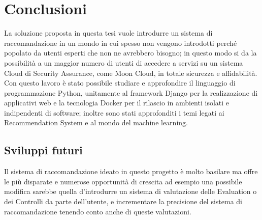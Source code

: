 \chapter{Conclusioni}\label{chp:05-conclusion}
La soluzione proposta in questa tesi vuole introdurre un sistema di raccomandazione in un mondo in cui spesso non vengono 
introdotti perché popolato da utenti esperti che non ne avrebbero bisogno; in questo modo si da la possibilità a un 
maggior numero di utenti di accedere a servizi su un sistema Cloud di Security Assurance, come 
Moon Cloud, in totale sicurezza e affidabilità.\hfill\break
Con questo lavoro è stato possibile studiare e approfondire il linguaggio di programmazione Python, unitamente al framework 
Django per la realizzazione di applicativi web e la tecnologia Docker per il rilascio in ambienti isolati e indipendenti 
di software; inoltre sono stati approfonditi i temi legati ai Recommendation System e al mondo del machine learning.
%
\section{Sviluppi futuri}
Il sistema di raccomandazione ideato in questo progetto è molto basilare ma offre le più disparate e numerose opportunità 
di crescita ad esempio una possibile modifica sarebbe quella d'introdurre un sistema di valutazione delle Evaluation o 
dei Controlli da parte dell'utente, e incrementare la precisione del sistema di raccomandazione tenendo conto anche di
queste valutazioni.
